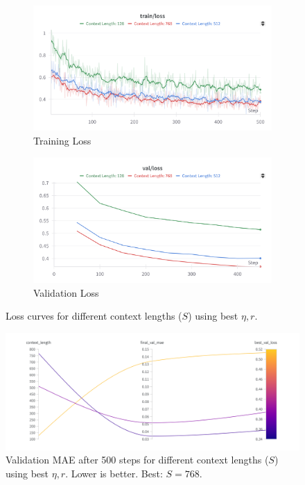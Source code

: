\documentclass{article}
\begin{document}
\begin{figure}[!htbp]
    \centering
    \begin{subfigure}[b]{0.48\linewidth} \centering
        \includegraphics[width=\linewidth]{M2 Course Work/Images/sweep_context_length_training.png}
        \caption{Training Loss} \label{fig:context_search_train_loss}
    \end{subfigure} \hfill
    \begin{subfigure}[b]{0.48\linewidth} \centering
        \includegraphics[width=\linewidth]{M2 Course Work/Images/sweep_context_length_validation.png}
        \caption{Validation Loss} \label{fig:context_search_valid_loss}
    \end{subfigure}
    \caption{Loss curves for different context lengths ($S$) using best $\eta, r$.} %
    \label{fig:context_search_loss_curves}
\end{figure}

\begin{figure}[!htbp]
    \centering
    \includegraphics[width=0.75\linewidth]{M2 Course Work//Images/sweep_context_length_result.png}
    \caption{Validation MAE after 500 steps for different context lengths ($S$) using best $\eta, r$. Lower is better. Best: $S=768$.} %
    \label{fig:context_search_results}
\end{figure}
\end{document}
